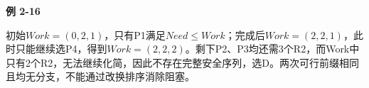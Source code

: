 {\color{ink}\bfseries 例 2-16}\par\vspace{1bp}初始\(Work=\allowbreak{}(0,\allowbreak{}2,\allowbreak{}1)\)，只有P1满足\(Need\le Work\)；完成后\(Work=\allowbreak{}(2,\allowbreak{}2,\allowbreak{}1)\)，此时只能继续选P4，得到\(Work=\allowbreak{}(2,\allowbreak{}2,\allowbreak{}2)\)。剩下P2、P3均还需3个R2，而Work中只有2个R2，无法继续化简，因此不存在完整安全序列，选D。两次可行前缀相同且均无分支，不能通过改换排序消除阻塞。
